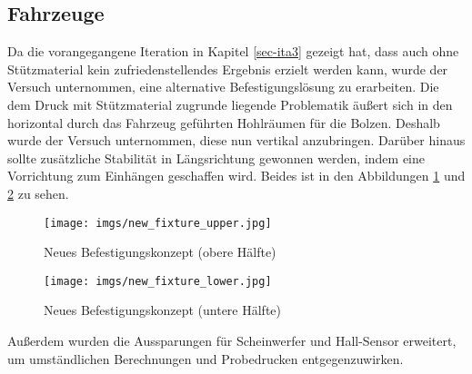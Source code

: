 \documentclass[.../Dokumentation.tex]{subfiles}
\begin{document}
\subsection{Fahrzeuge}\label{sec-ita4-cars}
Da die vorangegangene Iteration in Kapitel \ref{sec-ita3} gezeigt hat, dass auch ohne 
Stützmaterial kein zufriedenstellendes Ergebnis erzielt werden kann, 
wurde der Versuch unternommen, eine alternative Befestigungslösung zu erarbeiten. 
Die dem Druck mit Stützmaterial zugrunde liegende Problematik äußert sich in 
den horizontal durch das Fahrzeug geführten Hohlräumen für die Bolzen.
Deshalb wurde der Versuch unternommen, diese nun vertikal anzubringen.
Darüber hinaus sollte zusätzliche Stabilität in Längsrichtung gewonnen werden, 
indem eine Vorrichtung zum \grqq Einhängen\grqq{} geschaffen wird. 
Beides ist in den Abbildungen \ref{fig-new-fixture-upper} und 
\ref{fig-new-fixture-lower} zu sehen.
\begin{figure}[H]
\begin{center}
    \texttt{[image: imgs/new\_fixture\_upper.jpg]}
    \caption{Neues Befestigungskonzept (obere Hälfte)}
    \label{fig-new-fixture-upper}
\end{center}
\end{figure}
\noindent
\begin{figure}[H]
\begin{center}
    \texttt{[image: imgs/new\_fixture\_lower.jpg]}
    \caption{Neues Befestigungskonzept (untere Hälfte)}
    \label{fig-new-fixture-lower}
\end{center}
\end{figure}
\noindent 
Außerdem wurden die Aussparungen für Scheinwerfer und Hall-Sensor erweitert, 
um umständlichen Berechnungen und Probedrucken entgegenzuwirken.
\end{document}
